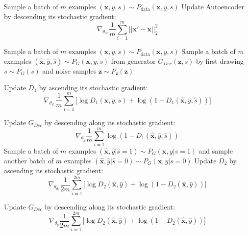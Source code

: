\documentclass[sigconf]{acmart}
\theoremstyle{definition}
\begin{document}
\begin{algorithm}[htb]
\begin{algorithmic}[1]
	\label{algr:start_pre}
		\State Sample a batch of $m$ examples $(\mathbf{x}, y, s) \sim P_{\text{data}}(\mathbf{x}, y, s)$
		\State Update Autoencoder by descending its stochastic gradient:
		\[\nabla_{\theta_{ae}} \frac{1}{m}\sum_{i=1}^m ||\mathbf{x}' - \mathbf{x}||_2^2\]
	\EndFor
	\label{algr:end_pre}

		\State Sample a batch of $m$ examples $(\mathbf{x}, y, s) \sim P_{\text{data}}(\mathbf{x}, y, s)$
		\label{algr:start_d1}
		\State Sample a batch of $m$ examples $(\hat{\mathbf{x}}, \hat{y}, \hat{s}) \sim P_{G}(\mathbf{x}, y, s)$ from generator $G_{Dec}(\mathbf{z}, s)$ by first drawing $s \sim P_{G}(s)$ and noise samples $\mathbf{z} \sim P_{\mathbf{z}}(\mathbf{z})$

		\State Update $D_1$ by ascending its stochastic gradient:
		\[\nabla_{\theta_{d_1}} \frac{1}{m}\sum_{i=1}^m \big[\log D_1(\mathbf{x}, y, s) + \log(1-D_1(\hat{\mathbf{x}}, \hat{y}, \hat{s}))\big]\]

		\State Update $G_{Dec}$ by descending along its stochastic gradient:
		\[\nabla_{\theta_{g}} \frac{1}{m}\sum_{i=1}^m \log(1-D_1(\hat{\mathbf{x}}, \hat{y}, \hat{s}))\]
		\label{algr:end_d1}
		\State Sample a batch of $m$ examples $(\hat{\mathbf{x}}, \hat{y} | \hat{s}=1) \sim P_{G}(\mathbf{x}, y|s=1)$ and sample another batch of $m$ examples $(\hat{\mathbf{x}}, \hat{y} | \hat{s}=0) \sim P_{G}(\mathbf{x}, y|s=0)$
		\label{algr:start_d2}
		\State Update $D_2$ by ascending its stochastic gradient:
		\[\nabla_{\theta_{d_2}} \frac{1}{2m}\sum_{i=1}^{2m} \big[\log D_2(\hat{\mathbf{x}}, \hat{y}) + \log(1-D_2(\hat{\mathbf{x}}, \hat{y}))\big]\]

		\State Update $G_{Dec}$ by descending along its stochastic gradient:
		\[\nabla_{\theta_{g}} \frac{1}{2m}\sum_{i=1}^{2m} \big[\log D_2(\hat{\mathbf{x}}, \hat{y}) + \log(1-D_2(\hat{\mathbf{x}}, \hat{y}))\big]\]
		\label{algr:end_d2}
	\EndFor
\end{algorithmic}
\caption{Minibatch stochastic gradient descent training of FairGAN.}
\label{algr:train}
\end{algorithm}
\end{document}
